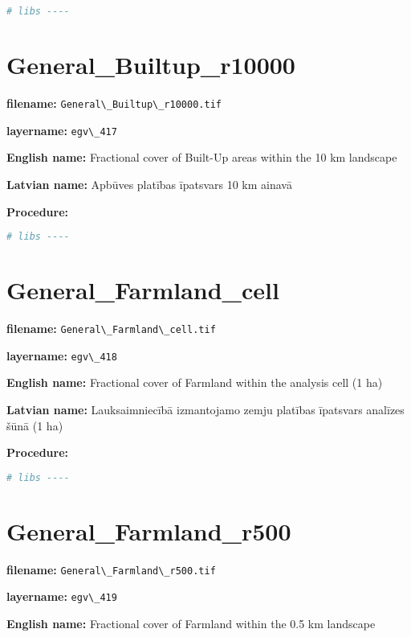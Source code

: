 \documentclass[
]{book}
\newcommand{\passthrough}[1]{#1}
\begin{document}
\begin{lstlisting}[language=R]
# libs ----
\end{lstlisting}

\section{General\_Builtup\_r10000}\label{ch06.417}

\textbf{filename:} \passthrough{\lstinline!General\_Builtup\_r10000.tif!}

\textbf{layername:} \passthrough{\lstinline!egv\_417!}

\textbf{English name:} Fractional cover of Built-Up areas within the 10 km landscape

\textbf{Latvian name:} Apbūves platības īpatsvars 10 km ainavā

\textbf{Procedure:}

\begin{lstlisting}[language=R]
# libs ----
\end{lstlisting}

\section{General\_Farmland\_cell}\label{ch06.418}

\textbf{filename:} \passthrough{\lstinline!General\_Farmland\_cell.tif!}

\textbf{layername:} \passthrough{\lstinline!egv\_418!}

\textbf{English name:} Fractional cover of Farmland within the analysis cell (1 ha)

\textbf{Latvian name:} Lauksaimniecībā izmantojamo zemju platības īpatsvars analīzes šūnā (1 ha)

\textbf{Procedure:}

\begin{lstlisting}[language=R]
# libs ----
\end{lstlisting}

\section{General\_Farmland\_r500}\label{ch06.419}

\textbf{filename:} \passthrough{\lstinline!General\_Farmland\_r500.tif!}

\textbf{layername:} \passthrough{\lstinline!egv\_419!}

\textbf{English name:} Fractional cover of Farmland within the 0.5 km landscape
\end{document}
